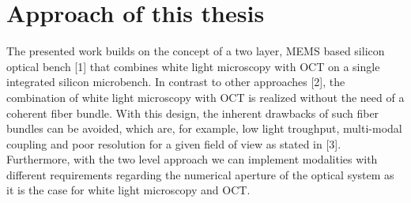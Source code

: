\section{Approach of this thesis}
The presented work builds on the concept of a two layer, MEMS based silicon optical bench [1] that combines white light microscopy with OCT on a single integrated silicon microbench. In contrast to other approaches [2], the combination of white light microscopy with OCT is realized without the need of a coherent fiber bundle. With this design, the inherent drawbacks of such fiber bundles can be avoided, which are, for example, low
light troughput, multi-modal coupling and poor resolution for a given field of view as stated in [3]. Furthermore, with the two level approach we can implement modalities with different requirements regarding the numerical aperture of the optical system as it is the case for white light microscopy and OCT.